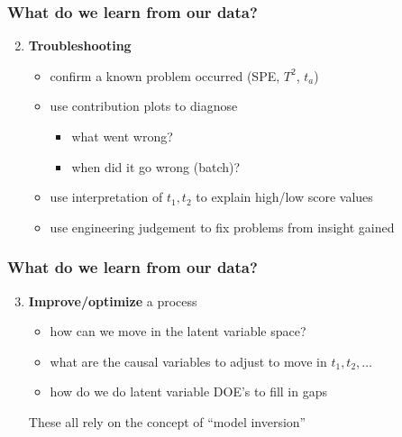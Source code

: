 \begin{frame}\frametitle{What do we learn from our data?}

\begin{enumerate}
	\setcounter{enumi}{1}
	\item {\bf \color{myGreen}Troubleshooting}
	\begin{itemize}
		\item 	confirm a known problem occurred (SPE, \( T^2 \), \( t_a \))
		\item 	use contribution plots to diagnose
		\begin{itemize}
			\item 	what went wrong?
			\item 	when did it go wrong (batch)? 
		\end{itemize}\pause
		
		\item 	use interpretation of \( t_1, t_2 \) to explain high/low score values\pause
		\item 	use engineering judgement to fix problems from insight gained
	\end{itemize}
\end{enumerate}
\end{frame}
	
\begin{frame}\frametitle{What do we learn from our data?}

\begin{enumerate}
	\setcounter{enumi}{2}
	\item {\bf \color{myGreen}Improve/optimize} a process
	\begin{itemize}
		\item 	how can we move in the latent variable space?
		\item 	what are the causal variables to adjust to move in \( t_1, t_2, \ldots \)
		\item 	how do we do latent variable DOE's to fill in gaps
	\end{itemize}	
	These all rely on the concept of \alert{``model inversion''}
\end{enumerate}
\end{frame}

